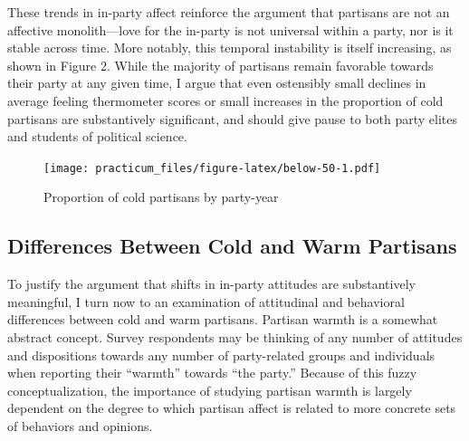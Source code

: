 \documentclass[
]{article}
\begin{document}
These trends in in-party affect reinforce the argument that partisans are not an affective monolith---love for the in-party is not universal within a party, nor is it stable across time. More notably, this temporal instability is itself increasing, as shown in Figure 2. While the majority of partisans remain favorable towards their party at any given time, I argue that even ostensibly small declines in average feeling thermometer scores or small increases in the proportion of cold partisans are substantively significant, and should give pause to both party elites and students of political science.

\begin{figure}
\centering
\texttt{[image: practicum\_files/figure-latex/below-50-1.pdf]}
\caption{\label{fig:below-50}Proportion of cold partisans by party-year}
\end{figure}

\clearpage

\hypertarget{differences-between-cold-and-warm-partisans}{%
\subsection{Differences Between Cold and Warm Partisans}\label{differences-between-cold-and-warm-partisans}}

To justify the argument that shifts in in-party attitudes are substantively meaningful, I turn now to an examination of attitudinal and behavioral differences between cold and warm partisans. Partisan warmth is a somewhat abstract concept. Survey respondents may be thinking of any number of attitudes and dispositions towards any number of party-related groups and individuals when reporting their ``warmth'' towards ``the party.'' Because of this fuzzy conceptualization, the importance of studying partisan warmth is largely dependent on the degree to which partisan affect is related to more concrete sets of behaviors and opinions.
\end{document}
